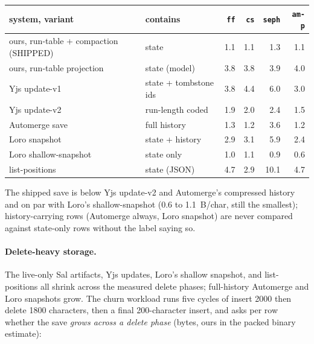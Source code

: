 \documentclass[11pt]{article}
\newcommand{\code}[1]{\texttt{#1}}
\begin{document}
\begin{center}\small
\setlength{\tabcolsep}{4.5pt}
\begin{tabular}{@{}llrrrr@{}}
\toprule
system, variant & contains & \code{ff} & \code{cs} & \code{seph} & \code{am-p} \\
\midrule
ours, run-table + compaction (SHIPPED) & state & 1.1 & 1.1 & 1.3 & 1.1 \\
ours, run-table projection & state (model) & 3.8 & 3.8 & 3.9 & 4.0 \\
Yjs update-v1 & state + tombstone ids & 3.8 & 4.4 & 6.0 & 3.0 \\
Yjs update-v2 & run-length coded & 1.9 & 2.0 & 2.4 & 1.5 \\
Automerge save & full history & 1.3 & 1.2 & 3.6 & 1.2 \\
Loro snapshot & state + history & 2.9 & 3.1 & 5.9 & 2.4 \\
Loro shallow-snapshot & state only & 1.0 & 1.1 & 0.9 & 0.6 \\
list-positions & state (JSON) & 4.7 & 2.9 & 10.1 & 4.7 \\
\bottomrule
\end{tabular}
\end{center}

\noindent The shipped save is below Yjs update-v2 and Automerge's
compressed history and on par with Loro's shallow-snapshot (0.6 to
1.1~B/char, still the smallest); history-carrying rows (Automerge always,
Loro snapshot) are never compared against state-only rows without the
label saying so.

\paragraph{Delete-heavy storage.} The live-only Sal artifacts, Yjs updates,
Loro's shallow snapshot, and list-positions all shrink across the measured
delete phases; full-history Automerge and Loro snapshots grow. The churn workload runs five cycles
of insert 2000 then delete 1800 characters, then a final 200-character
insert, and asks per row whether the save \emph{grows across a delete
phase} (bytes, ours in the packed binary estimate):
\end{document}
